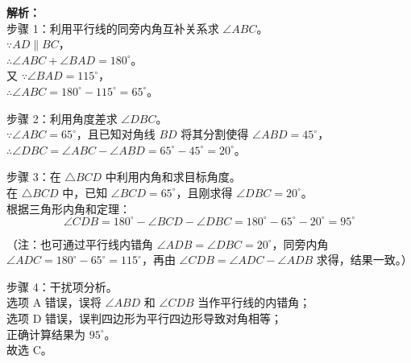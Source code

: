 \documentclass[12pt,a4paper]{exam-zh}
\begin{document}
\begin{solution}
    \textbf{解析：} \\
    步骤 1：利用平行线的同旁内角互补关系求 $\angle ABC$。\\
    $\because AD \parallel BC$，\\
    $\therefore \angle ABC + \angle BAD = 180^\circ$。\\
    又 $\because \angle BAD = 115^\circ$，\\
    $\therefore \angle ABC = 180^\circ - 115^\circ = 65^\circ$。

    步骤 2：利用角度差求 $\angle DBC$。\\
    $\because \angle ABC = 65^\circ$，且已知对角线 $BD$ 将其分割使得 $\angle ABD = 45^\circ$，\\
    $\therefore \angle DBC = \angle ABC - \angle ABD = 65^\circ - 45^\circ = 20^\circ$。

    步骤 3：在 $\triangle BCD$ 中利用内角和求目标角度。\\
    在 $\triangle BCD$ 中，已知 $\angle BCD = 65^\circ$，且刚求得 $\angle DBC = 20^\circ$。\\
    根据三角形内角和定理：
    \[ \displaystyle \angle CDB = 180^\circ - \angle BCD - \angle DBC = 180^\circ - 65^\circ - 20^\circ = 95^\circ \]
    
    （注：也可通过平行线内错角 $\angle ADB = \angle DBC = 20^\circ$，同旁内角 $\angle ADC = 180^\circ - 65^\circ = 115^\circ$，再由 $\angle CDB = \angle ADC - \angle ADB$ 求得，结果一致。）

    步骤 4：干扰项分析。\\
    选项 A 错误，误将 $\angle ABD$ 和 $\angle CDB$ 当作平行线的内错角；\\
    选项 D 错误，误判四边形为平行四边形导致对角相等；\\
    正确计算结果为 $95^\circ$。\\
    故选 C。
\end{solution}
\end{document}
